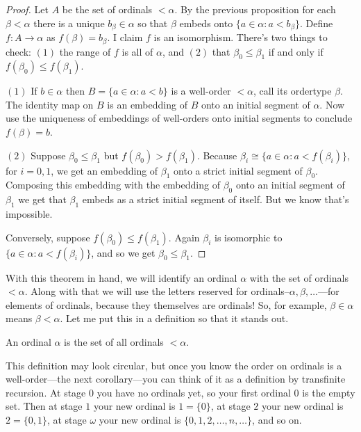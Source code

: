 \documentclass[10pt]{amsart}
\begin{document}
\begin{proof}
Let $A$ be the set of ordinals $< \alpha$. By the previous proposition for each $\beta < \alpha$ there is a unique $b_\beta \in \alpha$ so that $\beta$ embeds onto $\{a \in \alpha : a < b_\beta\}$. Define $f : A \to \alpha$ as $f(\beta) = b_\beta$. I claim $f$ is an isomorphism.
There's two things to check: $(1)$ the range of $f$ is all of $\alpha$, and $(2)$ that $\beta_0 \le \beta_1$ if and only if $f(\beta_0) \le f(\beta_1)$.

$(1)$ If $b \in \alpha$ then $B = \{ a \in \alpha : a < b\}$ is a well-order $< \alpha$, call its ordertype $\beta$. The identity map on $B$ is an embedding of $B$ onto an initial segment of $\alpha$. Now use the uniqueness of embeddings of well-orders onto initial segments to conclude $f(\beta) = b$.

$(2)$ Suppose $\beta_0 \le \beta_1$ but $f(\beta_0) > f(\beta_1)$. Because $\beta_i \cong \{ a \in \alpha : a < f(\beta_i)\}$, for $i = 0,1$, we get an embedding of $\beta_1$ onto a strict initial segment of $\beta_0$. Composing this embedding with the embedding of $\beta_0$ onto an initial segment of $\beta_1$ we get that $\beta_1$ embeds as a strict initial segment of itself. But we know that's impossible.

Conversely, suppose $f(\beta_0) \le f(\beta_1)$. Again $\beta_i$ is isomorphic to $\{a \in \alpha : a < f(\beta_i)\}$, and so we get $\beta_0 \le \beta_1$.
\end{proof}

With this theorem in hand, we will identify an ordinal $\alpha$ with the set of ordinals $<\alpha$. Along with that we will use the letters reserved for ordinals--$\alpha,\beta,\ldots$---for elements of ordinals, because they themselves are ordinals! So, for example, $\beta \in \alpha$ means $\beta < \alpha$. Let me put this in a definition so that it stands out.

\begin{definition}
An ordinal $\alpha$ is the set of all ordinals $<\alpha$.
\end{definition}

This definition may look circular, but once you know the order on ordinals is a well-order---the next corollary---you can think of it as a definition by transfinite recursion. At stage $0$ you have no ordinals yet, so your first ordinal $0$ is the empty set. Then at stage $1$ your new ordinal is $1 = \{0\}$, at stage $2$ your new ordinal is $2 = \{0,1\}$, at stage $\omega$ your new ordinal is $\{0,1,2,\ldots,n,\ldots\}$, and so on.
\end{document}
